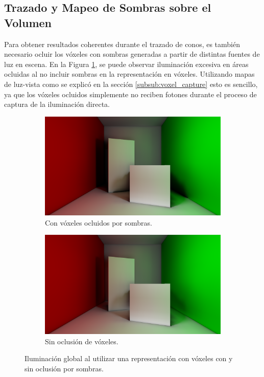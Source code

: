 \subsection{Trazado y Mapeo de Sombras sobre el Volumen} %
\label{sub:trazado_de_sombras_sobre_el_volumen}

Para obtener resultados coherentes durante el trazado de conos, es también necesario ocluir los vóxeles con sombras generadas a partir de distintas fuentes de luz en escena. En la Figura \ref{fig:voxel_shadow_error}, se puede observar iluminación excesiva en áreas ocluidas al no incluir sombras en la representación en vóxeles. Utilizando mapas de luz-vista como se explicó en la sección \ref{subsub:voxel_capture} esto es sencillo, ya que los vóxeles ocluidos simplemente no reciben fotones durante el proceso de captura de la iluminación directa.

\begin{figure}[H]
	\centering
	\begin{subfigure}[t]{0.49\textwidth}
		\centering
		\captionsetup{justification=centering}
		\includegraphics[width=\linewidth]{media/voxel_shadowing.png}
		\caption*{Con vóxeles ocluidos por sombras.}
	\end{subfigure}%
	\hspace{0.01\textwidth}
	\begin{subfigure}[t]{0.49\textwidth}
		\centering
		\captionsetup{justification=centering}
		\includegraphics[width=\linewidth]{media/voxel_noshadowing.png}
		\caption*{Sin oclusión de vóxeles.}
	\end{subfigure}%
	\caption{Iluminación global al utilizar una representación con vóxeles con y sin oclusión por sombras.}
	\label{fig:voxel_shadow_error}
\end{figure}

